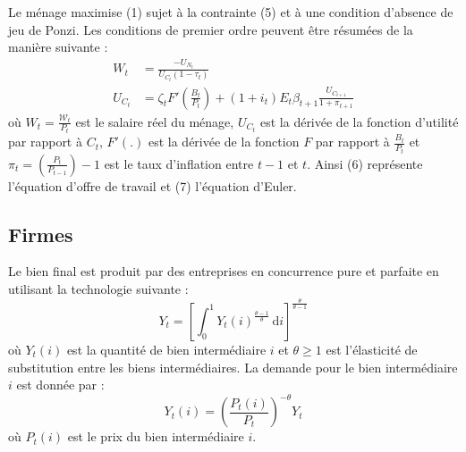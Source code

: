\documentclass[12pt,letterpaper]{article}
\newcommand{\Et}{E_t}
\newcommand{\WW}{\mathcal{W}}
\begin{document}
Le ménage maximise (1) sujet à la contrainte (5) et à une condition d’absence de jeu de Ponzi. Les conditions de premier ordre peuvent être résumées de la manière suivante :
\begin{align}
W_t &= \frac{-U_{N_t}}{U_{C_t}(1-\tau_t)} \tag{6}\\
U_{C_t} &= \zeta_t F'\!\left(\frac{B_t}{P_t}\right) + (1+i_t)\Et \beta_{t+1} \frac{U_{C_{t+1}}}{1+\pi_{t+1}} \tag{7}
\end{align}
où $W_t = \frac{\WW_t}{P_t}$ est le salaire réel du ménage, $U_{C_t}$ est la dérivée de la fonction d’utilité par rapport à $C_t$, $F'(.)$ est la dérivée de la fonction $F$ par rapport à $\frac{B_t}{P_t}$ et $\pi_t = \left(\frac{P_t}{P_{t-1}}\right) - 1$ est le taux d’inflation entre $t-1$ et $t$. Ainsi (6) représente l’équation d’offre de travail et (7) l’équation d’Euler.

\subsection{Firmes}

Le bien final est produit par des entreprises en concurrence pure et parfaite en utilisant la technologie suivante :
\begin{equation}
Y_t = \left[\int_0^1 Y_t(i)^{\frac{\theta-1}{\theta}}\, \mathrm{d}i\right]^{\frac{\theta}{\theta-1}} \tag{8}
\end{equation}
où $Y_t(i)$ est la quantité de bien intermédiaire $i$ et $\theta \geq 1$ est l’élasticité de substitution entre les biens intermédiaires. La demande pour le bien intermédiaire $i$ est donnée par :
\begin{equation}
Y_t(i) = \left(\frac{P_t(i)}{P_t}\right)^{-\theta} Y_t \tag{9}
\end{equation}
où $P_t(i)$ est le prix du bien intermédiaire $i$.
\end{document}
